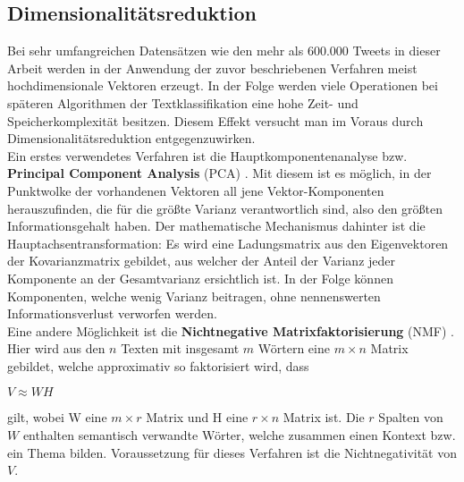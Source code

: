 \subsection{Dimensionalitätsreduktion}
Bei sehr umfangreichen Datensätzen wie den mehr als 600.000 Tweets in dieser Arbeit werden in der Anwendung der zuvor beschriebenen Verfahren meist hochdimensionale Vektoren erzeugt. In der Folge werden viele Operationen bei späteren Algorithmen der Textklassifikation eine hohe Zeit- und Speicherkomplexität besitzen. Diesem Effekt versucht man im Voraus durch Dimensionalitätsreduktion entgegenzuwirken.\\
Ein erstes verwendetes Verfahren ist die Hauptkomponentenanalyse bzw. \textbf{Principal Component Analysis} (PCA) \citep{Jol02}. Mit diesem ist es möglich, in der Punktwolke der vorhandenen Vektoren all jene Vektor-Komponenten herauszufinden, die für die größte Varianz verantwortlich sind, also den größten Informationsgehalt haben. Der mathematische Mechanismus dahinter ist die Hauptachsentransformation: Es wird eine Ladungsmatrix aus den Eigenvektoren der Kovarianzmatrix gebildet, aus welcher der Anteil der Varianz jeder Komponente an der Gesamtvarianz ersichtlich ist. In der Folge können Komponenten, welche wenig Varianz beitragen, ohne nennenswerten Informationsverlust verworfen werden.\\
Eine andere Möglichkeit ist die \textbf{Nichtnegative Matrixfaktorisierung} (NMF) \citep{LeeSeung99}. Hier wird aus den $n$ Texten mit insgesamt $m$ Wörtern eine $m \times n$ Matrix gebildet, welche approximativ so faktorisiert wird, dass
\begin{center}
	$V \approx W H$
\end{center}
gilt, wobei W eine $m \times r$ Matrix und H eine $r \times n$ Matrix ist. Die $r$ Spalten von $W$ enthalten semantisch verwandte Wörter, welche zusammen einen Kontext bzw. ein Thema bilden. Voraussetzung für dieses Verfahren ist die Nichtnegativität von $V$.\pagebreak